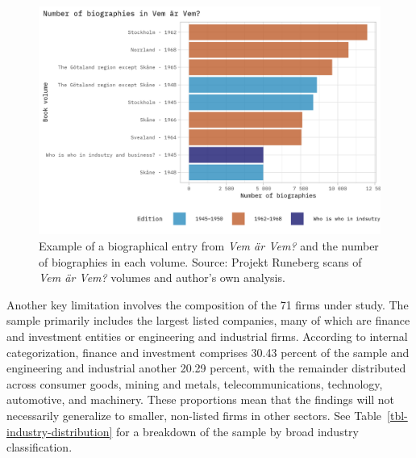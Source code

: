 \documentclass[
]{article}
\begin{document}
\begin{figure}
\begin{minipage}{0.50\linewidth}
{\includegraphics{images/who-is-who-volumes-2.png}

}


\end{minipage}%

\caption{\label{fig-vemarvem}Example of a biographical entry from
\emph{Vem är Vem?} and the number of biographies in each volume. Source:
Projekt Runeberg scans of \emph{Vem är Vem?} volumes and author's own
analysis.}

\end{figure}%

Another key limitation involves the composition of the 71 firms under
study. The sample primarily includes the largest listed companies, many
of which are finance and investment entities or engineering and
industrial firms. According to internal categorization, finance and
investment comprises 30.43 percent of the sample and engineering and
industrial another 20.29 percent, with the remainder distributed across
consumer goods, mining and metals, telecommunications, technology,
automotive, and machinery. These proportions mean that the findings will
not necessarily generalize to smaller, non-listed firms in other
sectors. See Table~\ref{tbl-industry-distribution} for a breakdown of
the sample by broad industry classification.
\end{document}
